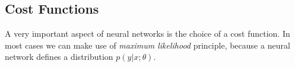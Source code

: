 \subsection{Cost Functions}
\label{sec:cost-functions}

A very important aspect of neural networks is the choice of a cost function.
In most cases we can make use of \emph{maximum likelihood} principle, because a neural network defines a distribution \(p(y \vert x ; \theta)\).